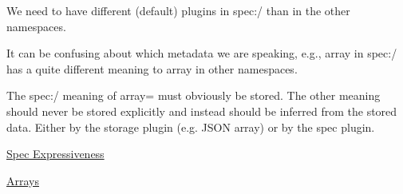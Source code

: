 \begin{DoxyItemize}
\item We need to have different (default) plugins in {\ttfamily spec\+:/} than in the other namespaces.
\item It can be confusing about which metadata we are speaking, e.\+g., {\ttfamily array} in {\ttfamily spec\+:/} has a quite different meaning to {\ttfamily array} in other namespaces.
\item The spec\+:/ meaning of array= must obviously be stored. The other meaning should never be stored explicitly and instead should be inferred from the stored data. Either by the storage plugin (e.\+g. J\+S\+ON array) or by the spec plugin.
\end{DoxyItemize}


\begin{DoxyItemize}
\item \hyperlink{doc_decisions_spec_expressiveness_md}{Spec Expressiveness}
\item \hyperlink{doc_decisions_array_md}{Arrays}
\end{DoxyItemize}